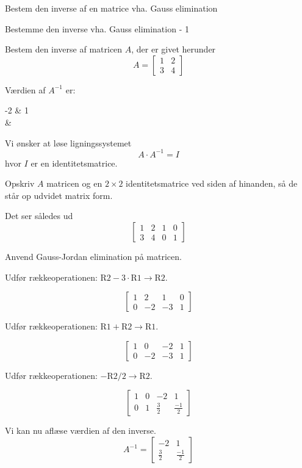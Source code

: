 \documentclass{article}
\begin{document}
Bestem den inverse af en matrice vha. Gauss elimination
\tableofcontents
\newpage

\begin{exercise}{Bestemme den inverse vha. Gauss elimination - 1}

Bestem den inverse af matricen $A$, der er givet herunder
\[
A = \left[\begin{array}{cc}
1 & 2 \\ 
3 & 4
\end{array} \right]
\]

Værdien af $A^{-1}$ er:
\begin{answermatrix}
-2 & 1 \\
 & 
\end{answermatrix}

\hint
Vi ønsker at løse ligningssystemet
\[
A \cdot A^{-1} = I
\]
hvor $I$ er en identitetsmatrice.

\hint
Opskriv $A$ matricen og en $2 \times 2$ identitetsmatrice
ved siden af hinanden, så de står op udvidet matrix form.

\hint
Det ser således ud
\[
\left[\begin{array}{cc|cc}
1 & 2 & 1 & 0 \\ 
3 & 4 & 0 & 1
\end{array} \right]
\]

\hint
Anvend Gauss-Jordan elimination på matricen.

\hint
Udfør rækkeoperationen: $\text{R2} - 3 \cdot \text{R1} \to \text{R2}$.

\hint
\[
\left[\begin{array}{cc|cc}
1 & 2 & 1 & 0 \\ 
0 & -2 & -3 & 1
\end{array} \right]
\]

\hint
Udfør rækkeoperationen: $\text{R1} + \text{R2} \to \text{R1}$.

\hint
\[
\left[\begin{array}{cc|cc}
1 & 0 & -2 & 1 \\ 
0 & -2 & -3 & 1
\end{array} \right]
\]

\hint
Udfør rækkeoperationen: $-\text{R2}/2 \to \text{R2}$.

\hint
\[
\left[\begin{array}{cc|cc}
1 & 0 & -2 & 1 \\ 
0 & 1 & \frac{3}{2} & \frac{-1}{2}
\end{array} \right]
\]

\hint
Vi kan nu aflæse værdien af den inverse.
\[
A^{-1} = \left[\begin{array}{cc}
-2 & 1 \\ 
\frac{3}{2} & \frac{-1}{2}
\end{array} \right]
\]

\end{exercise}
\end{document}
